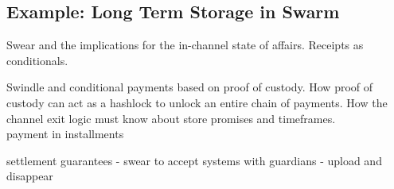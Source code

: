 \subsection{Example: Long Term Storage in Swarm}
Swear and the implications for the in-channel state of affairs. Receipts as conditionals.

Swindle and conditional payments based on proof of custody. How proof of custody can act as a hashlock to unlock an entire chain of payments. How the channel exit logic must know about store promises and timeframes.\\
payment in installments

settlement guarantees - swear to accept systems with guardians - upload and disappear